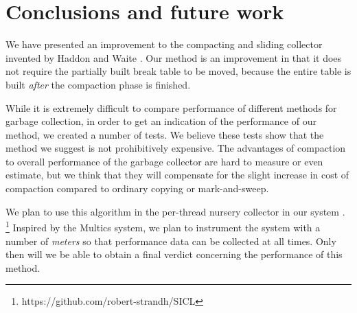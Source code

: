 \section{Conclusions and future work}

We have presented an improvement to the compacting and sliding
collector invented by Haddon and Waite \cite{Haddon:1967}.  Our method
is an improvement in that it does not require the partially built
break table to be moved, because the entire table is built
\emph{after} the compaction phase is finished.

While it is extremely difficult to compare performance of different
methods for garbage collection, in order to get an indication of the
performance of our method, we created a number of tests.  We believe
these tests show that the method we suggest is not prohibitively
expensive.  The advantages of compaction to overall performance of the
garbage collector are hard to measure or even estimate, but we think
that they will compensate for the slight increase in cost of
compaction compared to ordinary copying or mark-and-sweep.

We plan to use this algorithm in the per-thread nursery collector in
our system \sicl{}.%
\footnote{https://github.com/robert-strandh/SICL}
Inspired by the Multics system, we plan to
instrument the system with a number of \emph{meters} so that
performance data can be collected at all times.  Only then will we be
able to obtain a final verdict concerning the performance of this
method. 
